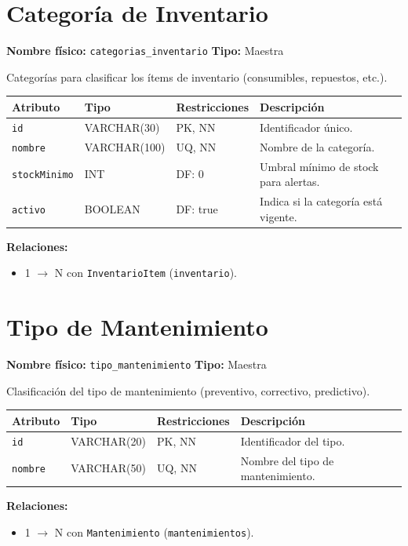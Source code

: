 \documentclass[12pt,a4paper]{article}
\newenvironment{tabladesc}[3]{%
  \section{#1}
  \textbf{Nombre físico:} \texttt{#2} \hfill \textbf{Tipo:} #3\par
  \medskip
}{%
  \bigskip
}
\begin{document}
\begin{tabladesc}{Categoría de Inventario}{categorias\_inventario}{Maestra}

Categorías para clasificar los ítems de inventario (consumibles, repuestos, etc.).

\bigskip
\begin{longtable}{L{3.5cm} L{2cm} L{1.8cm} L{8cm}}
\toprule
\textbf{Atributo} & \textbf{Tipo} & \textbf{Restricciones} & \textbf{Descripción} \\
\midrule
\endhead
\bottomrule
\endfoot
\texttt{id}        & VARCHAR(30)  & PK, NN & Identificador único. \\
\texttt{nombre}    & VARCHAR(100) & UQ, NN & Nombre de la categoría. \\
\texttt{stockMinimo}& INT         & DF: 0  & Umbral mínimo de stock para alertas. \\
\texttt{activo}    & BOOLEAN      & DF: true & Indica si la categoría está vigente. \\
\bottomrule
\end{longtable}

\textbf{Relaciones:}
\begin{itemize}[nosep]
  \item 1 $\rightarrow$ N con \texttt{InventarioItem} (\texttt{inventario}).
\end{itemize}
\end{tabladesc}

\begin{tabladesc}{Tipo de Mantenimiento}{tipo\_mantenimiento}{Maestra}

Clasificación del tipo de mantenimiento (preventivo, correctivo, predictivo).

\bigskip
\begin{longtable}{L{3.5cm} L{2cm} L{1.8cm} L{8cm}}
\toprule
\textbf{Atributo} & \textbf{Tipo} & \textbf{Restricciones} & \textbf{Descripción} \\
\midrule
\endhead
\bottomrule
\endfoot
\texttt{id}     & VARCHAR(20) & PK, NN & Identificador del tipo. \\
\texttt{nombre} & VARCHAR(50) & UQ, NN & Nombre del tipo de mantenimiento. \\
\bottomrule
\end{longtable}

\textbf{Relaciones:}
\begin{itemize}[nosep]
  \item 1 $\rightarrow$ N con \texttt{Mantenimiento} (\texttt{mantenimientos}).
\end{itemize}
\end{tabladesc}
\end{document}
